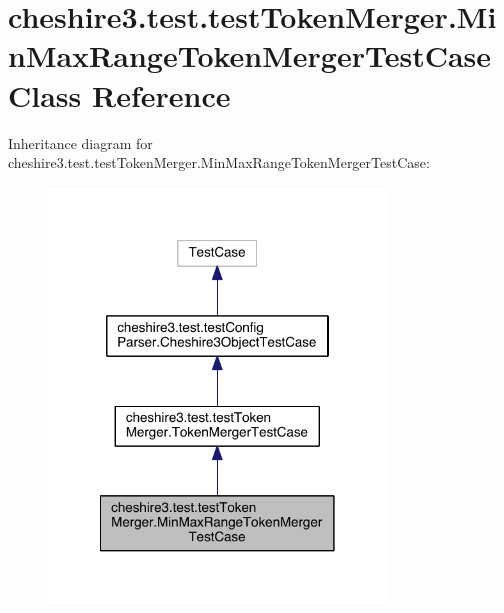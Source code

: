 \hypertarget{classcheshire3_1_1test_1_1test_token_merger_1_1_min_max_range_token_merger_test_case}{\section{cheshire3.\-test.\-test\-Token\-Merger.\-Min\-Max\-Range\-Token\-Merger\-Test\-Case Class Reference}
\label{classcheshire3_1_1test_1_1test_token_merger_1_1_min_max_range_token_merger_test_case}
}


Inheritance diagram for cheshire3.\-test.\-test\-Token\-Merger.\-Min\-Max\-Range\-Token\-Merger\-Test\-Case\-:
\nopagebreak
\begin{figure}[H]
\begin{center}
\leavevmode
\includegraphics[width=254pt]{classcheshire3_1_1test_1_1test_token_merger_1_1_min_max_range_token_merger_test_case__inherit__graph}
\end{center}
\end{figure}


